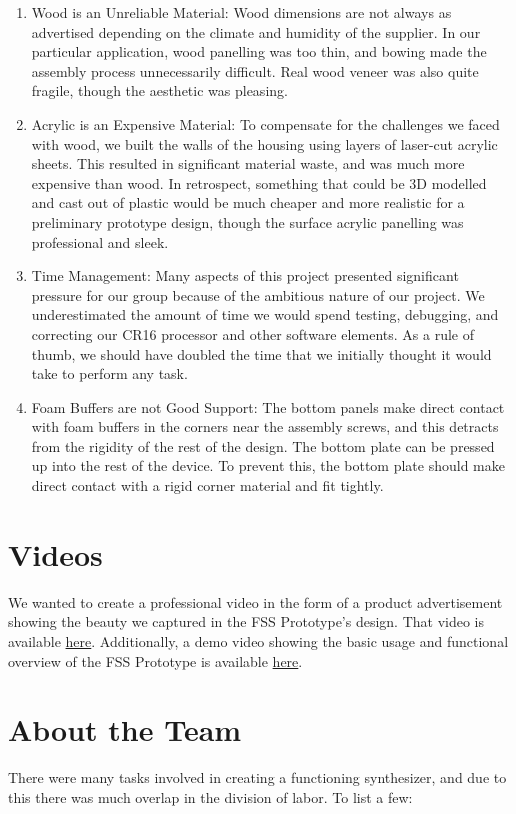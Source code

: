 \documentclass[conference]{IEEEtran}
\begin{document}
\begin{enumerate}
  \item Wood is an Unreliable Material: Wood dimensions are not always as advertised depending on the climate and humidity of the supplier. In our particular application, wood panelling was too thin, and bowing made the assembly process unnecessarily difficult. Real wood veneer was also quite fragile, though the aesthetic was pleasing.
  \item Acrylic is an Expensive Material: To compensate for the challenges we faced with wood, we built the walls of the housing using layers of laser-cut acrylic sheets. This resulted in significant material waste, and was much more expensive than wood. In retrospect, something that could be 3D modelled and cast out of plastic would be much cheaper and more realistic for a preliminary prototype design, though the surface acrylic panelling was professional and sleek.
  \item Time Management: Many aspects of this project presented significant pressure for our group because of the ambitious nature of our project. We underestimated the amount of time we would spend testing, debugging, and correcting our CR16 processor and other software elements. As a rule of thumb, we should have doubled the time that we initially thought it would take to perform any task.
  \item Foam Buffers are not Good Support: The bottom panels make direct contact with foam buffers in the corners near the assembly screws, and this detracts from the rigidity of the rest of the design. The bottom plate can be pressed up into the rest of the device. To prevent this, the bottom plate should make direct contact with a rigid corner material and fit tightly.
\end{enumerate}
\section{Videos}
We wanted to create a professional video in the form of a product advertisement showing the beauty we captured in the FSS Prototype's design. That video is available \href{https://jacobpeterson.net/uofu-ece-3710/ad-video-redirect.html}{here}. Additionally, a demo video showing the basic usage and functional overview of the FSS Prototype is available \href{https://jacobpeterson.net/uofu-ece-3710/demo-video-redirect.html}{here}.

\section{About the Team}
There were many tasks involved in creating a functioning synthesizer, and due to this there was much overlap in the division of labor. To list a few:
\end{document}
